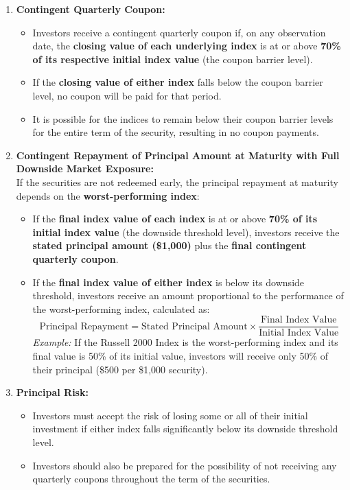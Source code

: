 \documentclass[12pt,a4paper]{article}
\begin{document}
\begin{enumerate}[label=\textbf{\arabic*.}]
    \item \textbf{Contingent Quarterly Coupon:} \\
    \begin{itemize}
        \item Investors receive a contingent quarterly coupon if, on any observation date, the \textbf{closing value of each underlying index} is at or above \textbf{70\% of its respective initial index value} (the coupon barrier level).
        \item If the \textbf{closing value of either index} falls below the coupon barrier level, no coupon will be paid for that period.
        \item It is possible for the indices to remain below their coupon barrier levels for the entire term of the security, resulting in no coupon payments.
    \end{itemize}

    \item \textbf{Contingent Repayment of Principal Amount at Maturity with Full Downside Market Exposure:} \\
    If the securities are not redeemed early, the principal repayment at maturity depends on the \textbf{worst-performing index}:
    \begin{itemize}
        \item If the \textbf{final index value of each index} is at or above \textbf{70\% of its initial index value} (the downside threshold level), investors receive the \textbf{stated principal amount (\$1,000)} plus the \textbf{final contingent quarterly coupon}.
        \item If the \textbf{final index value of either index} is below its downside threshold, investors receive an amount proportional to the performance of the worst-performing index, calculated as:
        \[
        \text{Principal Repayment} = \text{Stated Principal Amount} \times \frac{\text{Final Index Value}}{\text{Initial Index Value}}
        \]
        \textit{Example:} If the Russell 2000 Index is the worst-performing index and its final value is 50\% of its initial value, investors will receive only 50\% of their principal (\$500 per \$1,000 security).
    \end{itemize}

    \item \textbf{Principal Risk:} \\
    \begin{itemize}
        \item Investors must accept the risk of losing some or all of their initial investment if either index falls significantly below its downside threshold level.
        \item Investors should also be prepared for the possibility of not receiving any quarterly coupons throughout the term of the securities.
    \end{itemize}


\end{enumerate}
\end{document}
